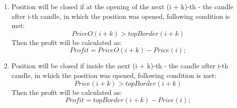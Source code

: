 \documentclass{tewiart}
\begin{document}
\begin{enumerate}
\item Position will be closed if at the opening of the next (i + k)-th - the candle after i-th candle, in which the position was opened, following condition is met: 
\begin{equation}
PriceO(i+k) >topBorder(i+k)
\end{equation} 
Then the profit will be calculated as:
\begin{equation}
Profit =PriceO (i+k) -  Price(i) ;
\end{equation}

\item Position will be closed if inside the next (i + k)-th - the candle after i-th candle, in which the position was opened, following condition is met: 
\begin{equation}
Price(i+k) >topBorder(i+k)
\end{equation} 
Then the profit will be calculated as:
\begin{equation}
Profit =topBorder (i+k) -  Price(i) ;
\end{equation}

\end{enumerate}
\end{document}
